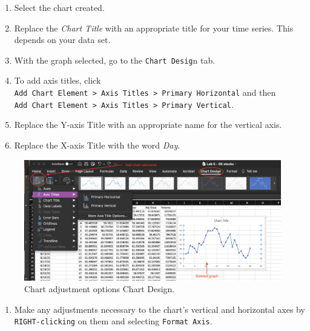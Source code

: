 \documentclass[
  12pt,
  letterpaper,
]{book}
\providecommand{\tightlist}{%
  \setlength{\itemsep}{0pt}\setlength{\parskip}{0pt}}
\begin{document}
\begin{enumerate}
\def\labelenumi{\arabic{enumi}.}
\setcounter{enumi}{2}
\tightlist
\item
  Select the chart created.
\item
  Replace the \emph{Chart Title} with an appropriate title for your time series. This depends on your data set.
\item
  With the graph selected, go to the \texttt{Chart\ Desig}n tab.
\item
  To add axis titles, click \texttt{Add\ Chart\ Element\ \textgreater{}\ Axis\ Titles\ \textgreater{}\ Primary\ Horizontal} and then \texttt{Add\ Chart\ Element\ \textgreater{}\ Axis\ Titles\ \textgreater{}\ Primary\ Vertical}.
\item
  Replace the Y-axis Title with an appropriate name for the vertical axis.
\item
  Replace the X-axis Title with the word \emph{Day}.
\end{enumerate}

\begin{figure}

{\centering \includegraphics[width=0.95\linewidth]{images/adjust-scatter} 

}

\caption{Chart adjustment options Chart Design.}\label{fig:adjust-scatter}
\end{figure}

\begin{enumerate}
\def\labelenumi{\arabic{enumi}.}
\setcounter{enumi}{8}
\tightlist
\item
  Make any adjustments necessary to the chart's vertical and horizontal axes by \texttt{RIGHT-clicking} on them and selecting \texttt{Format\ Axis}.
\end{enumerate}
\end{document}
